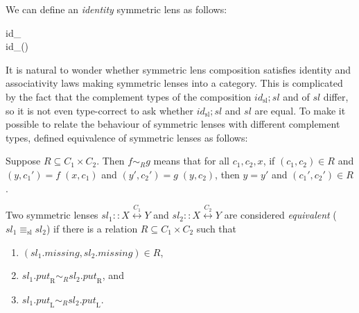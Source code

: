 \documentclass[runningheads]{llncs}
\newcommand{\Conid}[1]{\mathit{#1}}
\newcommand{\Varid}[1]{\mathit{#1}}
\def\resethooks{\global\let\SaveRestoreHook\empty
  \global\let\ColumnHook\empty}
\let\hspost\empty
\begin{document}
We can define an \emph{identity} symmetric lens as follows:
\begin{hscode}\SaveRestoreHook
\column{B}{@{}>{\hspre}l<{\hspost}@{}}\column{3}{@{}>{\hspre}l<{\hspost}@{}}\column{E}{@{}>{\hspre}l<{\hspost}@{}}\>[3]{}id_{}\mathbin{::}\alpha\mathbin{\stackrel{()}{\longleftrightarrow}}\alpha{}\<[E]\\
\>[3]{}id_{}\mathrel{=}\Conid{SLens}\;\Varid{id}\;\Varid{id}\;(){}\<[E]\ColumnHook
\end{hscode}\resethooks
It is natural to wonder whether symmetric lens composition satisfies
identity and associativity laws making symmetric lenses into a
category.  This is complicated by the fact that the complement types of
the composition \ensuremath{id_{\mathrm{sl}};\Varid{sl}} and of \ensuremath{\Varid{sl}} differ, so it is not even 
type-correct to ask whether \ensuremath{id_{\mathrm{sl}};\Varid{sl}} and \ensuremath{\Varid{sl}} are equal.  To make
it possible to relate the behaviour of symmetric lenses with different
complement types, \HPWlong{} defined equivalence of symmetric lenses
as follows:
\begin{definition}
  Suppose \ensuremath{\Conid{R}\subseteq\Conid{C}_{1} \times \Conid{C}_{2}}.  Then \ensuremath{\Varid{f} \sim_{\Conid{R}} \Varid{g}} 
means that for
  all \ensuremath{\Varid{c}_{1},\Varid{c}_{2},\Varid{x}}, if \ensuremath{(\Varid{c}_{1},\Varid{c}_{2})\in\Conid{R}} and \ensuremath{(\Varid{y},\Varid{c}_{1}')\mathrel{=}\Varid{f}\;(\Varid{x},\Varid{c}_{1})} and \ensuremath{(\Varid{y'},\Varid{c}_{2}')\mathrel{=}\Varid{g}\;(\Varid{y},\Varid{c}_{2})}, then \ensuremath{\Varid{y}\mathrel{=}\Varid{y'}} and \ensuremath{(\Varid{c}_{1}',\Varid{c}_{2}')\in\Conid{R}}.
\end{definition}
\begin{definition}\label{def:hpw-equiv}
  Two symmetric lenses \ensuremath{\Varid{sl}_{1}\mathbin{::}\Conid{X}\mathbin{\stackrel{\Conid{C}_{1}}{\longleftrightarrow}}\Conid{Y}} and \ensuremath{\Varid{sl}_{2}\mathbin{::}\Conid{X}\mathbin{\stackrel{\Conid{C}_{2}}{\longleftrightarrow}}\Conid{Y}}
  are considered \emph{equivalent} (\ensuremath{\Varid{sl}_{1}\equiv_{\mathrm{sl}} \Varid{sl}_{2}}) if there is a
  relation \ensuremath{\Conid{R}\subseteq\Conid{C}_{1} \times \Conid{C}_{2}} such that 
  \begin{enumerate}
\item     \ensuremath{(\Varid{sl}_{1}\mathord{.}\Varid{missing},\Varid{sl}_{2}\mathord{.}\Varid{missing})\in\Conid{R}}, 
\item \ensuremath{\Varid{sl}_{1}\mathord{.}\Varid{put}_\mathrm{R} \sim_{\Conid{R}} \Varid{sl}_{2}\mathord{.}\Varid{put}_\mathrm{R}}, 
and 
\item \ensuremath{\Varid{sl}_{1}\mathord{.}\Varid{put}_\mathrm{L} \sim_{\Conid{R}} \Varid{sl}_{2}\mathord{.}\Varid{put}_\mathrm{L}}.
  \end{enumerate}\endswithdisplay
\end{definition}
\end{document}

